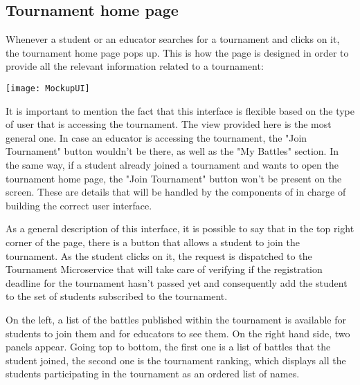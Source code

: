 \begin{minipage}{\linewidth}

\subsection{Tournament home page}
Whenever a student or an educator searches for a tournament and clicks on it, the tournament home page pops up. 
This is how the page is designed in order to provide all the relevant information related to a tournament:

\begin{center}
	\texttt{[image: MockupUI]}
\end{center}

\end{minipage}

It is important to mention the fact that this interface is flexible based on the type of user that is accessing the tournament. The view provided here is the most general one. In case an educator is accessing the tournament, the "Join Tournament" button wouldn't be there, as well as the "My Battles" section. In the same way, if a student already joined a tournament and wants to open the tournament home page, the "Join Tournament" button won't be present on the screen. These are details that will be handled by the components of \app in charge of building the correct user interface.

As a general description of this interface, it is possible to say that in the top right corner of the page, there is a button that allows a student to join the tournament. As the student clicks on it, the request is dispatched to the Tournament Microservice that will take care of verifying if the registration deadline for the tournament hasn't passed yet and consequently add the student to the set of students subscribed to the tournament.

On the left, a list of the battles published within the tournament is available for students to join them and for educators to see them. 
On the right hand side, two panels appear. Going top to bottom, the first one is a list of battles that the student joined, the second one is the tournament ranking, which displays all the students participating in the tournament as an ordered list of names.


